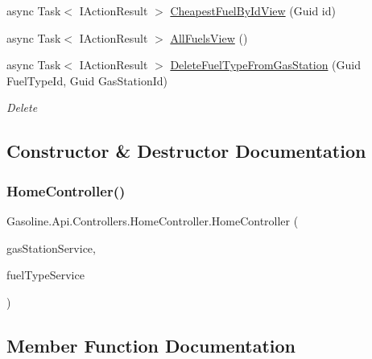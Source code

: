 \begin{DoxyCompactItemize}
\item 
async Task$<$ I\+Action\+Result $>$ \mbox{\hyperlink{class_gasoline_1_1_api_1_1_controllers_1_1_home_controller_a7f7616e4d987b6e6e963c11196026d43}{Cheapest\+Fuel\+By\+Id\+View}} (Guid id)
\item 
async Task$<$ I\+Action\+Result $>$ \mbox{\hyperlink{class_gasoline_1_1_api_1_1_controllers_1_1_home_controller_ae7ab573461296ed42de801a116fffba5}{All\+Fuels\+View}} ()
\item 
async Task$<$ I\+Action\+Result $>$ \mbox{\hyperlink{class_gasoline_1_1_api_1_1_controllers_1_1_home_controller_a19180cc06e27c2af5805a845acc66605}{Delete\+Fuel\+Type\+From\+Gas\+Station}} (Guid Fuel\+Type\+Id, Guid Gas\+Station\+Id)
\begin{DoxyCompactList}\small\item\em Delete \end{DoxyCompactList}\end{DoxyCompactItemize}


\subsection{Constructor \& Destructor Documentation}
\mbox{\label{class_gasoline_1_1_api_1_1_controllers_1_1_home_controller_a65c957f2baa0cd11017c11837a098189}} 
\subsubsection{\texorpdfstring{HomeController()}{HomeController()}}
{\footnotesize\ttfamily Gasoline.\+Api.\+Controllers.\+Home\+Controller.\+Home\+Controller (\begin{DoxyParamCaption}\item[{\mbox{\hyperlink{interface_gasoline_1_1_data_1_1_services_1_1_i_gas_station_service}{I\+Gas\+Station\+Service}}}]{gas\+Station\+Service,  }\item[{\mbox{\hyperlink{interface_gasoline_1_1_data_1_1_services_1_1_i_fuel_type_service}{I\+Fuel\+Type\+Service}}}]{fuel\+Type\+Service }\end{DoxyParamCaption})}



\subsection{Member Function Documentation}
\mbox{\label{class_gasoline_1_1_api_1_1_controllers_1_1_home_controller_acbf8bfd66f84fb558cc60b9fa7056e91}} 
